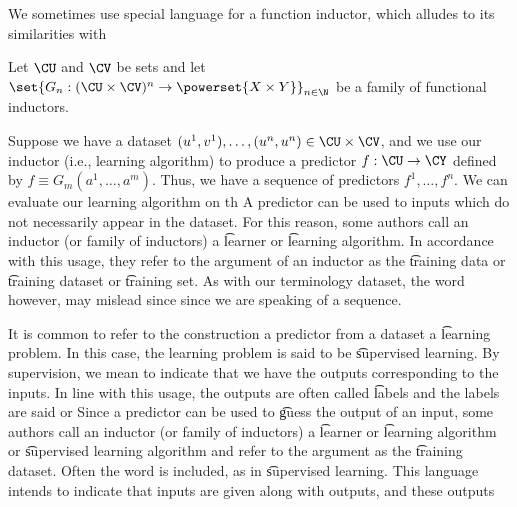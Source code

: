 
We sometimes use special language for a function inductor, which alludes to its similarities with 


Let $\CU$ and $\CV$ be sets and let $\set{G_n: (\CU \times \CV)^n \to \powerset{X \times  Y}}_{n \in \N }$ be a family of functional inductors.

Suppose we have a dataset $(u^1, v^1), \dots , (u^n, u^n) \in \CU \times  \CV$, and we use our inductor (i.e., learning algorithm) to produce a predictor $f: \CU \to \CY$ defined by $f \equiv G_m(a^1, \dots , a^m)$.
Thus, we have a sequence of predictors $f^1, \dots , f^n$.
We can evaluate our learning algorithm on th
A predictor can be used to  inputs which do not necessarily appear in the dataset.
For this reason, some authors call an inductor (or family of inductors) a \t{learner} or \t{learning algorithm}.
In accordance with this usage, they refer to the argument of an inductor as the \t{training data} or \t{training dataset} or \t{training set}.
As with our terminology dataset, the word  however, may mislead since since we are speaking of a sequence.

It is common to refer to the construction a predictor from a dataset a \t{learning problem}.
In this case, the learning problem is said to be \t{supervised learning}.
By supervision, we mean to indicate that we have the outputs corresponding to the inputs.
In line with this usage, the outputs are often called \t{labels} and the labels are said  or 
Since a predictor can be used to \t{guess} the output of an input, some authors call an inductor (or family of inductors) a \t{learner} or \t{learning algorithm} or \t{supervised learning algorithm} and refer to the argument as the \t{training dataset}.
Often the word  is included, as in \t{supervised learning}.
This language intends to indicate that inputs are given along with outputs, and these outputs 

\blankpage

